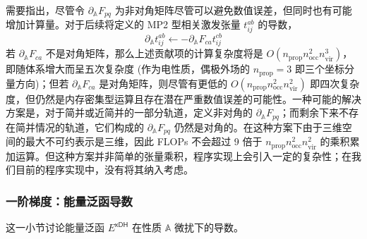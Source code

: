 需要指出，尽管令 $\partial_\mathbb{A} F_{pq}$ 为非对角矩阵尽管可以避免数值误差，但同时也有可能增加计算量。对于后续将定义的 MP2 型相关激发张量 $t_{ij}^{ab}$ 的导数，
\begin{equation*}
  \partial_\mathbb{A} t_{ij}^{ab} \leftarrow - \partial_\mathbb{A} F_{ca} t_{ij}^{cb}
\end{equation*}
若 $\partial_\mathbb{A} F_{ca}$ 不是对角矩阵，那么上述贡献项的计算复杂度将是 $O(n_\mathrm{prop} n_\mathrm{occ}^2 n_\mathrm{vir}^3)$，即随体系增大而呈五次复杂度 (作为电性质，偶极外场的 $n_\mathrm{prop} = 3$ 即三个坐标分量方向)；但若 $\partial_\mathbb{A} F_{ca}$ 是对角矩阵，则尽管有更低的 $O(n_\mathrm{prop} n_\mathrm{occ}^2 n_\mathrm{vir}^2)$ 即四次复杂度，但仍然是内存密集型运算且存在潜在严重数值误差的可能性。一种可能的解决方案是，对于简并或近简并的一部分轨道，定义非对角的 $\partial_\mathbb{A} F_{pq}$；而剩余下来不存在简并情况的轨道，它们构成的 $\partial_\mathbb{A} F_{pq}$ 仍然是对角的。在这种方案下由于三维空间的最大不可约表示是三维，因此 FLOPs 不会超过 9 倍于 $n_\mathrm{prop} n_\mathrm{occ}^2 n_\mathrm{vir}^2$ 的乘积累加运算\cite{Stoychev-Neese.JCTC.2018}。但这种方案并非简单的张量乘积，程序实现上会引入一定的复杂性；在我们目前的程序实现中，没有将其纳入考虑。

\subsubsection{一阶梯度：能量泛函导数}

这一小节讨论能量泛函 $E^\textsf{xDH}$ 在性质 $\mathbb{A}$ 微扰下的导数。

